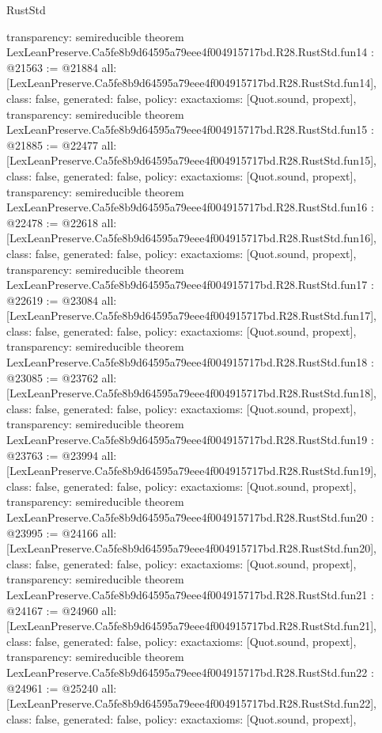 \begin{lexlean}{RustStd}
\begin{coremodule}
{  transparency: semireducible
}
theorem LexLeanPreserve.Ca5fe8b9d64595a79eee4f004915717bd.R28.RustStd.fun14 : @21563 := @21884 {
  all: [LexLeanPreserve.Ca5fe8b9d64595a79eee4f004915717bd.R28.RustStd.fun14],
  class: false,
  generated: false,
  policy: exact{axioms: [Quot.sound, propext]},
  transparency: semireducible
}
theorem LexLeanPreserve.Ca5fe8b9d64595a79eee4f004915717bd.R28.RustStd.fun15 : @21885 := @22477 {
  all: [LexLeanPreserve.Ca5fe8b9d64595a79eee4f004915717bd.R28.RustStd.fun15],
  class: false,
  generated: false,
  policy: exact{axioms: [Quot.sound, propext]},
  transparency: semireducible
}
theorem LexLeanPreserve.Ca5fe8b9d64595a79eee4f004915717bd.R28.RustStd.fun16 : @22478 := @22618 {
  all: [LexLeanPreserve.Ca5fe8b9d64595a79eee4f004915717bd.R28.RustStd.fun16],
  class: false,
  generated: false,
  policy: exact{axioms: [Quot.sound, propext]},
  transparency: semireducible
}
theorem LexLeanPreserve.Ca5fe8b9d64595a79eee4f004915717bd.R28.RustStd.fun17 : @22619 := @23084 {
  all: [LexLeanPreserve.Ca5fe8b9d64595a79eee4f004915717bd.R28.RustStd.fun17],
  class: false,
  generated: false,
  policy: exact{axioms: [Quot.sound, propext]},
  transparency: semireducible
}
theorem LexLeanPreserve.Ca5fe8b9d64595a79eee4f004915717bd.R28.RustStd.fun18 : @23085 := @23762 {
  all: [LexLeanPreserve.Ca5fe8b9d64595a79eee4f004915717bd.R28.RustStd.fun18],
  class: false,
  generated: false,
  policy: exact{axioms: [Quot.sound, propext]},
  transparency: semireducible
}
theorem LexLeanPreserve.Ca5fe8b9d64595a79eee4f004915717bd.R28.RustStd.fun19 : @23763 := @23994 {
  all: [LexLeanPreserve.Ca5fe8b9d64595a79eee4f004915717bd.R28.RustStd.fun19],
  class: false,
  generated: false,
  policy: exact{axioms: [Quot.sound, propext]},
  transparency: semireducible
}
theorem LexLeanPreserve.Ca5fe8b9d64595a79eee4f004915717bd.R28.RustStd.fun20 : @23995 := @24166 {
  all: [LexLeanPreserve.Ca5fe8b9d64595a79eee4f004915717bd.R28.RustStd.fun20],
  class: false,
  generated: false,
  policy: exact{axioms: [Quot.sound, propext]},
  transparency: semireducible
}
theorem LexLeanPreserve.Ca5fe8b9d64595a79eee4f004915717bd.R28.RustStd.fun21 : @24167 := @24960 {
  all: [LexLeanPreserve.Ca5fe8b9d64595a79eee4f004915717bd.R28.RustStd.fun21],
  class: false,
  generated: false,
  policy: exact{axioms: [Quot.sound, propext]},
  transparency: semireducible
}
theorem LexLeanPreserve.Ca5fe8b9d64595a79eee4f004915717bd.R28.RustStd.fun22 : @24961 := @25240 {
  all: [LexLeanPreserve.Ca5fe8b9d64595a79eee4f004915717bd.R28.RustStd.fun22],
  class: false,
  generated: false,
  policy: exact{axioms: [Quot.sound, propext]},
}
\end{coremodule}
\end{lexlean}
